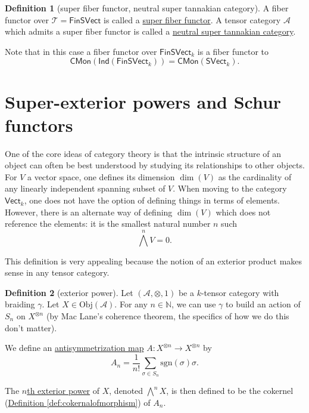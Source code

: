 \documentclass[a4paper,10pt]{scrreprt}
\newcommand{\N}{\mathbb{N}}
\newcommand{\defn}[1]{\ul{#1}}
\newcommand{\Obj}{\mathrm{Obj}}
\theoremstyle{definition}
\newtheorem{definition}{Definition}[section]
\theoremstyle{plain}
\theoremstyle{remark}
\begin{document}
\begin{definition}[super fiber functor, neutral super tannakian category]
  \label{def:suberfiberfunctorneutralsupertannakiancategory}
  A fiber functor over $\mathscr{T} = \mathsf{FinSVect}$ is called a \defn{super fiber functor}. A tensor category $\mathscr{A}$ which admits a super fiber functor is called a \defn{neutral super tannakian category}.

  Note that in this case a fiber functor over $\mathsf{FinSVect}_{k}$ is a fiber functor to
  \begin{equation*}
    \mathsf{CMon}(\mathsf{Ind}(\mathsf{FinSVect}_{k})) = \mathsf{CMon}(\mathsf{SVect}_{k}).
  \end{equation*}
\end{definition}

\section{Super-exterior powers and Schur functors}
One of the core ideas of category theory is that the intrinsic structure of an object can often be best understood by studying its relationships to other objects. For $V$ a vector space, one defines its dimension $\dim(V)$ as the cardinality of any linearly independent spanning subset of $V$. When moving to the category $\mathsf{Vect}_{k}$, one does not have the option of defining things in terms of elements. However, there is an alternate way of defining $\dim(V)$ which does not reference the elements: it is the smallest natural number $n$ such 
\begin{equation*}
  \bigwedge^{n} V = 0.
\end{equation*}

This definition is very appealing because the notion of an exterior product makes sense in any tensor category. 

\begin{definition}[exterior power]
  \label{def:exteriorpowerintensorcategory}
  Let $(\mathscr{A}, \otimes, 1)$ be a $k$-tensor category with braiding $\gamma$. Let $X \in \Obj(\mathscr{A})$. For any $n \in \N$, we can use $\gamma$ to build an action of $S_{n}$ on $X^{\otimes n}$ (by Mac Lane's coherence theorem, the specifics of how we do this don't matter).

  We define an \defn{antisymmetrization map} $A\colon X^{\otimes n} \to X^{\otimes n}$ by
  \begin{equation*}
    A_{n} = \frac{1}{n!}\sum_{\sigma \in S_{n}} \mathrm{sgn}(\sigma) \sigma.
  \end{equation*}

  The \defn{$n$th exterior power} of $X$, denoted $\bigwedge^{n}X$, is then defined to be the cokernel (\hyperref[def:cokernalofmorphism]{Definition \ref*{def:cokernalofmorphism}}) of $A_{n}$.
\end{definition}
\end{document}
